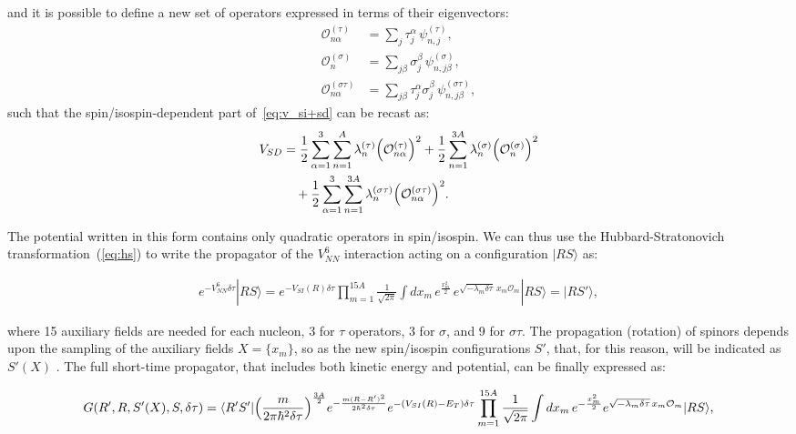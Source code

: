 \documentclass[aps,prc,twocolumn,superscriptaddress,floatfix]{revtex4-1}
\begin{document}
and it is possible to define a new set of operators expressed in terms of their eigenvectors: 
\begin{align}
\mathcal O_{n\alpha}^{(\tau)}&=\sum_{j}\tau_j^\alpha\,\psi_{n,j}^{(\tau)} , \nonumber \\
\mathcal O_{n}^{(\sigma)}&=\sum_{j\beta}\sigma_j^\beta\,\psi_{n,j\beta}^{(\sigma)} , \nonumber \\
\mathcal O_{n\alpha}^{(\sigma\tau)}&=\sum_{j\beta}\tau_j^\alpha\sigma_j^\beta\,\psi_{n,j\beta}^{(\sigma\tau)} , \nonumber 
\end{align}
such that the spin/isospin-dependent part of~\cref{eq:v_si+sd} can be recast as:
\begin{align}
V_{SD}&= 
 {1\over2}\sum_{\alpha=1}^3\sum_{n=1}^{A} \lambda_n^{(\tau)}\Big(\mathcal O_{n\alpha}^{(\tau)}\Big)^2
+{1\over2}\sum_{n=1}^{3A} \lambda_n^{(\sigma)}\Big(\mathcal O_n^{(\sigma)}\Big)^2 \nonumber \\
&\quad+{1\over2}\sum_{\alpha=1}^3\sum_{n=1}^{3A} \lambda_n^{(\sigma\tau)}\Big(\mathcal O_{n\alpha}^{(\sigma\tau)}\Big)^2 .
\end{align}

The potential written in this form contains only quadratic operators in spin/isospin. 
We can thus use the Hubbard-Stratonovich transformation~(\ref{eq:hs}) to write the
propagator of the $V_{NN}^6$ interaction acting on a configuration $|RS\rangle$ as:
\begin{widetext}
\begin{align}
e^{-V_{NN}^6\delta\tau}|RS\rangle=e^{-V_{SI}(R)\delta\tau}\prod_{m=1}^{15A}\frac{1}{\sqrt{2\pi}}
\displaystyle\int dx_m\,e^{\frac{x_m^2}{2}}\,e^{\sqrt{-\lambda_m\delta\tau}\,x_m \mathcal O_m}|RS\rangle
=|RS'\rangle ,
\end{align}
\end{widetext}
where 15 auxiliary fields are needed for each nucleon, 3 for $\tau$ operators, 3 for $\sigma$,
and 9 for $\sigma\tau$. The propagation (rotation) of spinors depends upon the sampling
of the auxiliary fields $X=\{x_m\}$, so as the new spin/isospin configurations $S'$, that, for this 
reason, will be indicated as $S'(X)$ .
The full short-time propagator, that includes both kinetic energy and potential, can be 
finally expressed as:
\begin{widetext}
\begin{align}
G(R',R,S'(X),S,\delta\tau)=\langle R'S'|\Big({m\over2\pi\hbar^2\delta\tau}\Big)^{3A\over2}e^{-{m(R-R')^2\over2\hbar^2\delta\tau}}
e^{-(V_{SI}(R)-E_T)\delta\tau}
\prod_{m=1}^{15A}{1\over\sqrt{2\pi}}\int dx_m\,e^{-{x_m^2\over2}}
e^{\sqrt{-\lambda_m\delta\tau}\,x_m \mathcal O_m}|RS\rangle,
\label{eq:prop}
\end{align}
\end{widetext}
\end{document}
